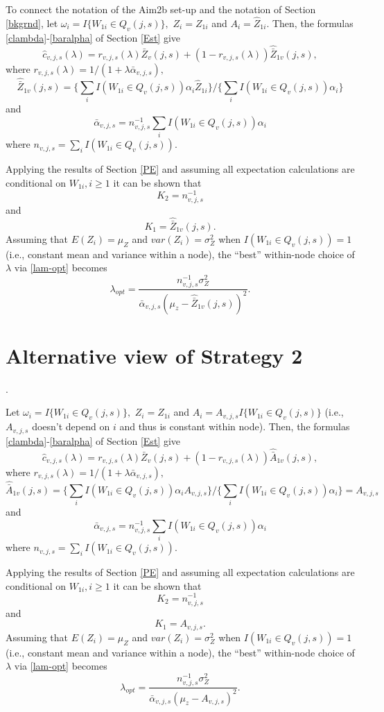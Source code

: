 \documentclass[12pt]{article}
\begin{document}
To connect the notation of the Aim2b set-up and the notation of Section \ref{bkgrnd}, let $\omega_i = I\{ W_{1i} \in Q_{v}(j,s) \},$ $Z_i = Z_{1i}$
 and $A_i = \hat Z_{1i}$. Then, the formulas \eqref{clambda}-\eqref{baralpha}
 of Section \ref{Est} give
 \[
\widehat{c}_{v,j,s}(\lambda) =
r_{v,j,s}(\lambda) \bar{Z}_v(j,s) + (1-r_{v,j,s}(\lambda)) \hat{\bar{Z}}_{1v}(j,s),
\]
where $r_{v,j,s}(\lambda) = 1/(1 + \lambda \bar{\alpha}_{v,j,s}),$
\[
\hat{\bar{Z}}_{1v}(j,s) =
\{ \sum_i I(W_{1i} \in Q_{v}(j,s)) \alpha_i  \hat{Z}_{1i} \}
/ \{ \sum_i I(W_{1i} \in Q_{v}(j,s)) \alpha_i \}
\]
and
\[
\bar{\alpha}_{v,j,s} =  n^{-1}_{v,j,s} \sum_i I(W_{1i} \in Q_{v}(j,s)) \alpha_i
\]
where $n_{v,j,s} =  \sum_i I( W_{1i} \in Q_{v}(j,s) ).$

Applying the results of Section \ref{PE} and assuming all expectation
calculations are conditional on $W_{1i}, i \geq 1$ it can be shown that
\[
K_2 = n^{-1}_{v,j,s}
\]
and
\[
K_1 = \hat{\bar{Z}}_{1v}(j,s).
\]
Assuming that $E(Z_i) = \mu_Z$ and $var(Z_i) = \sigma^2_Z$ when 
$I( W_{1i} \in Q_{v}(j,s) ) =1$ (i.e., constant mean and variance within
a node), the ``best'' within-node choice of $\lambda$ via \eqref{lam-opt} becomes
\begin{equation}
\lambda_{opt} = \frac{n^{-1}_{v,j,s} \sigma^2_Z}{ \bar{\alpha}_{v,j,s} (\mu_z -  \hat{\bar{Z}}_{1v}(j,s))^2}.
\end{equation}




\section{Alternative view of Strategy 2}.

Let $\omega_i = I\{ W_{1i} \in Q_{v}(j,s) \},$ $Z_i = Z_{1i}$
 and $A_i = A_{v,j,s} I\{ W_{1i} \in Q_{v}(j,s) \}$ (i.e.,
 $A_{v,j,s}$ doesn't depend on $i$ and thus is constant within node).
 Then, the formulas \eqref{clambda}-\eqref{baralpha}
 of Section \ref{Est} give
 \[
\widehat{c}_{v,j,s}(\lambda) =
r_{v,j,s}(\lambda) \bar{Z}_v(j,s) + (1-r_{v,j,s}(\lambda)) \hat{\bar{A}}_{1v}(j,s),
\]
where $r_{v,j,s}(\lambda) = 1/(1 + \lambda \bar{\alpha}_{v,j,s}),$
\[
\hat{\bar{A}}_{1v}(j,s) =
\{ \sum_i I(W_{1i} \in Q_{v}(j,s)) \alpha_i  A_{v,j,s}  \}
/ \{ \sum_i I(W_{1i} \in Q_{v}(j,s)) \alpha_i \} = A_{v,j,s}
\]
and
\[
\bar{\alpha}_{v,j,s} =  n^{-1}_{v,j,s} \sum_i I(W_{1i} \in Q_{v}(j,s)) \alpha_i
\]
where $n_{v,j,s} =  \sum_i I( W_{1i} \in Q_{v}(j,s) ).$

Applying the results of Section \ref{PE} and assuming all expectation
calculations are conditional on $W_{1i}, i \geq 1$ it can be shown that
\[
K_2 = n^{-1}_{v,j,s}
\]
and
\[
K_1 = A_{v,j,s}.
\]
Assuming that $E(Z_i) = \mu_Z$ and $var(Z_i) = \sigma^2_Z$ when 
$I( W_{1i} \in Q_{v}(j,s) ) =1$ (i.e., constant mean and variance within
a node), the ``best'' within-node choice of $\lambda$ via \eqref{lam-opt} becomes
\[
\lambda_{opt} = \frac{n^{-1}_{v,j,s} \sigma^2_Z}{ \bar{\alpha}_{v,j,s} (\mu_z -  A_{v,j,s})^2}.
\]
\end{document}
